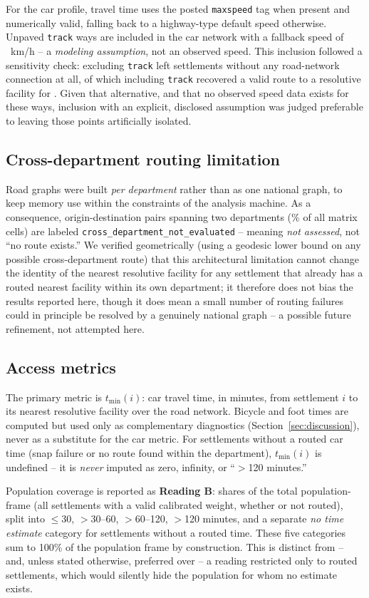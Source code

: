For the car profile, travel time uses the posted \texttt{maxspeed} tag when present and numerically valid, falling back to a highway-type default speed otherwise. Unpaved \texttt{track} ways are included in the car network with a fallback speed of \TrackFallbackSpeed\ km/h -- a \emph{modeling assumption}, not an observed speed. This inclusion followed a sensitivity check: excluding \texttt{track} left \TrackPreviouslyIsolated{} settlements without any road-network connection at all, of which including \texttt{track} recovered a valid route to a resolutive facility for \TrackRecovers. Given that alternative, and that no observed speed data exists for these ways, inclusion with an explicit, disclosed assumption was judged preferable to leaving those points artificially isolated.

\subsection{Cross-department routing limitation}
\label{sec:crossdept}

Road graphs were built \emph{per department} rather than as one national graph, to keep memory use within the constraints of the analysis machine. As a consequence, origin-destination pairs spanning two departments (\CrossDeptNotEvaluatedPct\% of all matrix cells) are labeled \texttt{cross\_department\_not\_evaluated} -- meaning \emph{not assessed}, not ``no route exists.'' We verified geometrically (using a geodesic lower bound on any possible cross-department route) that this architectural limitation cannot change the identity of the nearest resolutive facility for any settlement that already has a routed nearest facility within its own department; it therefore does not bias the results reported here, though it does mean a small number of routing failures could in principle be resolved by a genuinely national graph -- a possible future refinement, not attempted here.

\subsection{Access metrics}
\label{sec:metrics}

The primary metric is $t_{\min}(i)$: car travel time, in minutes, from settlement $i$ to its nearest resolutive facility over the road network. Bicycle and foot times are computed but used only as complementary diagnostics (Section~\ref{sec:discussion}), never as a substitute for the car metric. For settlements without a routed car time (snap failure or no route found within the department), $t_{\min}(i)$ is undefined -- it is \emph{never} imputed as zero, infinity, or ``$>$120 minutes.''

Population coverage is reported as \textbf{Reading B}: shares of the total population-frame (all settlements with a valid calibrated weight, whether or not routed), split into $\leq$30, $>$30--60, $>$60--120, $>$120 minutes, and a separate \emph{no time estimate} category for settlements without a routed time. These five categories sum to 100\% of the population frame by construction. This is distinct from -- and, unless stated otherwise, preferred over -- a reading restricted only to routed settlements, which would silently hide the population for whom no estimate exists.
